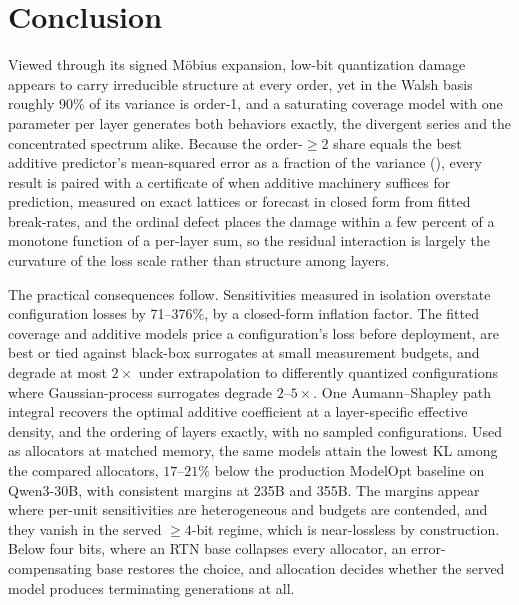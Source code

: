 













\clearpage
\appendix











\section{Conclusion}\label{sec:conclusion}

Viewed through its signed M\"obius expansion, low-bit quantization damage appears to carry irreducible
structure at every order, yet in the Walsh basis roughly 90\% of its variance is order-1, and a
saturating coverage model with one parameter per layer generates both behaviors exactly, the divergent
series and the concentrated spectrum alike. Because the order-$\ge 2$ share equals the best additive
predictor's mean-squared error as a fraction of the variance (\thmone), every result is paired with a
certificate of when additive machinery suffices for prediction, measured on exact lattices or forecast in closed form
from fitted break-rates, and the ordinal defect places the damage within a few percent of a monotone
function of a per-layer sum, so the residual interaction is largely the curvature of the loss scale
rather than structure among layers.

The practical consequences follow. Sensitivities measured in isolation overstate configuration losses
by 71--376\%, by a closed-form inflation factor. The fitted coverage and additive models price a
configuration's loss before deployment, are best or tied against black-box surrogates at small
measurement budgets, and degrade at most $2\times$ under extrapolation to differently quantized
configurations where Gaussian-process surrogates degrade $2$--$5\times$. One Aumann--Shapley path
integral recovers the optimal additive coefficient at a layer-specific effective density, and the
ordering of layers exactly, with no sampled configurations. Used as allocators
at matched memory, the same models
attain the lowest KL among the compared allocators, $17$--$21\%$ below the production ModelOpt baseline
on Qwen3-30B, with consistent margins at 235B and 355B. The
margins
appear where per-unit sensitivities are heterogeneous and budgets are contended, and they vanish in the
served $\ge 4$-bit regime, which is near-lossless by construction. Below four bits, where an RTN
base collapses every allocator, an error-compensating base restores the choice, and allocation decides
whether the served model produces terminating generations at all. 

